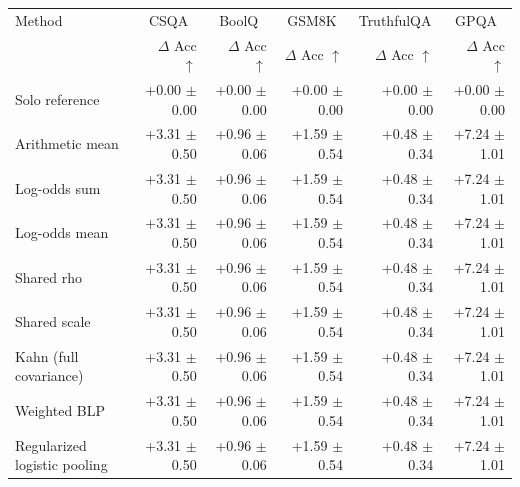 \begin{tabular}{lrrrrr}
\toprule
Method & \multicolumn{1}{c}{CSQA} & \multicolumn{1}{c}{BoolQ} & \multicolumn{1}{c}{GSM8K} & \multicolumn{1}{c}{TruthfulQA} & \multicolumn{1}{c}{GPQA} \\
 & $\Delta$ Acc $\uparrow$ & $\Delta$ Acc $\uparrow$ & $\Delta$ Acc $\uparrow$ & $\Delta$ Acc $\uparrow$ & $\Delta$ Acc $\uparrow$ \\
\midrule
Solo reference & +0.00 {\scriptsize $\pm$ 0.00} & +0.00 {\scriptsize $\pm$ 0.00} & +0.00 {\scriptsize $\pm$ 0.00} & +0.00 {\scriptsize $\pm$ 0.00} & +0.00 {\scriptsize $\pm$ 0.00} \\
Arithmetic mean & +3.31 {\scriptsize $\pm$ 0.50} & +0.96 {\scriptsize $\pm$ 0.06} & +1.59 {\scriptsize $\pm$ 0.54} & +0.48 {\scriptsize $\pm$ 0.34} & +7.24 {\scriptsize $\pm$ 1.01} \\
Log-odds sum & +3.31 {\scriptsize $\pm$ 0.50} & +0.96 {\scriptsize $\pm$ 0.06} & +1.59 {\scriptsize $\pm$ 0.54} & +0.48 {\scriptsize $\pm$ 0.34} & +7.24 {\scriptsize $\pm$ 1.01} \\
Log-odds mean & +3.31 {\scriptsize $\pm$ 0.50} & +0.96 {\scriptsize $\pm$ 0.06} & +1.59 {\scriptsize $\pm$ 0.54} & +0.48 {\scriptsize $\pm$ 0.34} & +7.24 {\scriptsize $\pm$ 1.01} \\
Shared rho & +3.31 {\scriptsize $\pm$ 0.50} & +0.96 {\scriptsize $\pm$ 0.06} & +1.59 {\scriptsize $\pm$ 0.54} & +0.48 {\scriptsize $\pm$ 0.34} & +7.24 {\scriptsize $\pm$ 1.01} \\
Shared scale & +3.31 {\scriptsize $\pm$ 0.50} & +0.96 {\scriptsize $\pm$ 0.06} & +1.59 {\scriptsize $\pm$ 0.54} & +0.48 {\scriptsize $\pm$ 0.34} & +7.24 {\scriptsize $\pm$ 1.01} \\
Kahn (full covariance) & +3.31 {\scriptsize $\pm$ 0.50} & +0.96 {\scriptsize $\pm$ 0.06} & +1.59 {\scriptsize $\pm$ 0.54} & +0.48 {\scriptsize $\pm$ 0.34} & +7.24 {\scriptsize $\pm$ 1.01} \\
Weighted BLP & +3.31 {\scriptsize $\pm$ 0.50} & +0.96 {\scriptsize $\pm$ 0.06} & +1.59 {\scriptsize $\pm$ 0.54} & +0.48 {\scriptsize $\pm$ 0.34} & +7.24 {\scriptsize $\pm$ 1.01} \\
Regularized logistic pooling & +3.31 {\scriptsize $\pm$ 0.50} & +0.96 {\scriptsize $\pm$ 0.06} & +1.59 {\scriptsize $\pm$ 0.54} & +0.48 {\scriptsize $\pm$ 0.34} & +7.24 {\scriptsize $\pm$ 1.01} \\

\end{tabular}
